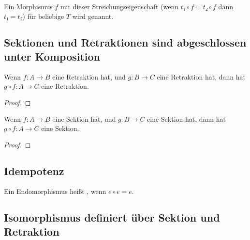 \documentclass[parskip=half]{scrreprt}
\begin{document}
\begin{definition}[Epimorphismus]
Ein Morphismus $f$ mit dieser Streichungseigenschaft 
(wenn $t₁ ∘ f = t₂ ∘ f$ dann $t₁ = t₂$) für beliebige $T$ wird 
 genannt.
\end{definition}


\newpage
\subsection{Sektionen und Retraktionen sind abgeschlossen unter Komposition}

\begin{theorem}
Wenn $f: A → B$ eine Retraktion hat, und $g: B → C$ eine Retraktion hat,
dann hat $g ∘ f: A → C$ eine Retraktion.
\end{theorem}
\begin{proof}
\end{proof}

\begin{theorem}
Wenn $f: A → B$ eine Sektion hat, und $g: B → C$ eine Sektion hat,
dann hat $g ∘ f: A → C$ eine Sektion.
\end{theorem}
\begin{proof}
\end{proof}

\newpage
\subsection{Idempotenz}

\begin{definition}[Idempotenz]
Ein Endomorphismus heißt , wenn $e ∘ e = e$.
\end{definition}



\newpage
\subsection{Isomorphismus definiert über Sektion und Retraktion}
\end{document}
